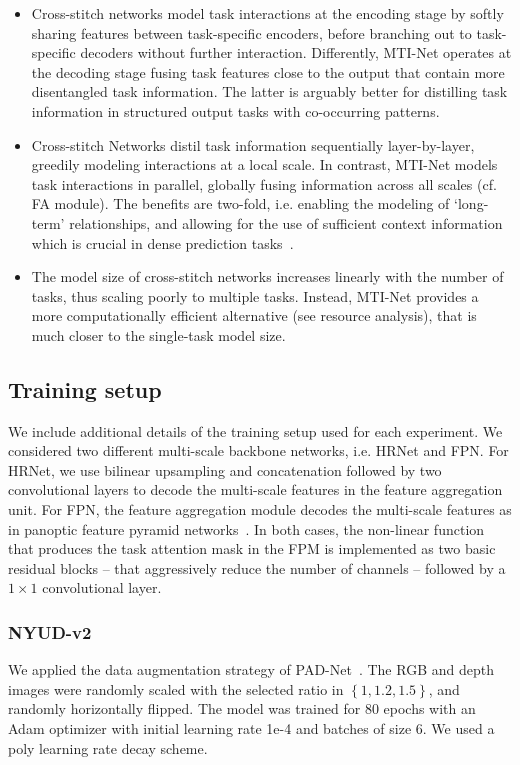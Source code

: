 \documentclass[runningheads]{llncs}
\begin{document}
\begin{itemize}
\item Cross-stitch networks model task interactions at the encoding stage by softly sharing features between task-specific encoders, before branching out to task-specific decoders without further interaction. Differently, MTI-Net operates at the decoding stage fusing task features close to the output that contain more disentangled task information. The latter is arguably better for distilling task information in structured output tasks with co-occurring patterns.

\item Cross-stitch Networks distil task information sequentially layer-by-layer, greedily modeling interactions at a local scale. In contrast, MTI-Net models task interactions in parallel, globally fusing information across all scales (cf. FA module). The benefits are two-fold, i.e. enabling the modeling of ‘long-term’ relationships, and allowing for the use of sufficient context information which is crucial in dense prediction tasks~\cite{chen2018encoder}.

\item The model size of cross-stitch networks  increases linearly with the number of tasks, thus scaling poorly to multiple tasks. Instead, MTI-Net provides a more computationally efficient alternative (see resource analysis), that is much closer to the single-task model size.
\end{itemize}


\subsection{Training setup}
We include additional details of the training setup used for each experiment. We considered two different multi-scale backbone networks, i.e. HRNet and FPN. For HRNet, we use bilinear upsampling and concatenation followed by two convolutional layers to decode the multi-scale features in the feature aggregation unit. For FPN, the feature aggregation module decodes the multi-scale features as in panoptic feature pyramid networks~\cite{kirillov2019panoptic}. In both cases, the non-linear function that produces the task attention mask in the FPM is implemented as two basic residual blocks -- that aggressively reduce the number of channels -- followed by a $1 \times 1$ convolutional layer. 

\subsubsection{NYUD-v2}
We applied the data augmentation strategy of PAD-Net~\cite{xu2018pad}. The RGB and depth images were randomly scaled with the selected ratio in $\left\{1,1.2,1.5\right\}$, and randomly horizontally flipped. The model was trained for 80 epochs with an Adam optimizer with initial learning rate 1e-4 and batches of size 6. We used a poly learning rate decay scheme.
\end{document}
